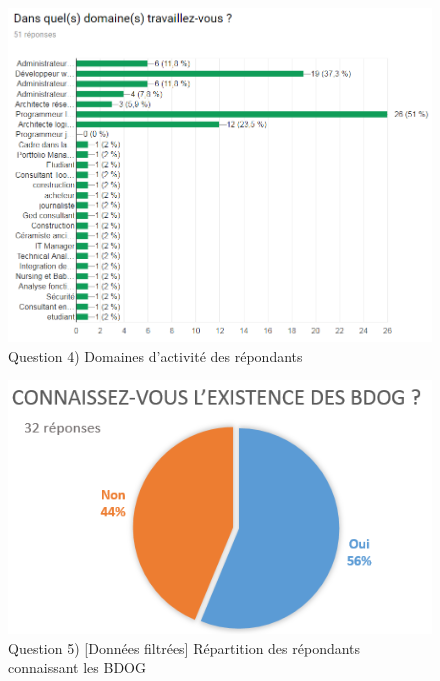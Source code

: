 \documentclass[a4paper,fleqn,12pt,oneside]{report}
\begin{document}
\begin{figure}[!ht]
\centering
\includegraphics[scale=1]{figures/QProf.png}
\caption{Question 4) Domaines d'activité des répondants}
\label{fig:QProf}
\end{figure}
\begin{figure}[!ht]
\centering
\includegraphics[scale=1]{figures/QExistFilt.png}
\caption{Question 5) [Données filtrées] Répartition des répondants connaissant les BDOG}
\label{fig:QExistFilt}
\end{figure}
\end{document}
